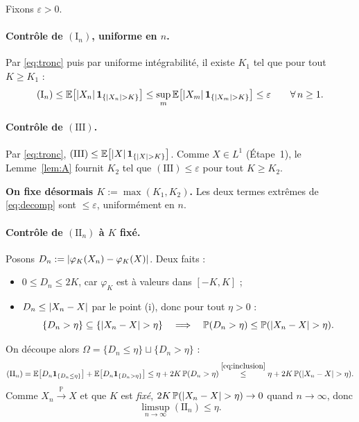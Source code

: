 \documentclass[11pt,a4paper]{article}
\theoremstyle{definition}
\theoremstyle{remark}
\newcommand{\E}{\mathbb{E}}
\newcommand{\PP}{\mathbb{P}}
\newcommand{\ind}[1]{\mathbf{1}_{#1}}
\newcommand{\convP}{\xrightarrow{\ \PP\ }}
\DeclarePairedDelimiter{\abs}{\lvert}{\rvert}
\begin{document}
Fixons $\varepsilon > 0$.

\paragraph{Contrôle de $(\mathrm{I}_n)$, uniforme en $n$.}
Par \eqref{eq:tronc} puis par uniforme intégrabilité, il existe $K_1$ tel que
pour tout $K \ge K_1$ :
\[
(\mathrm{I}_n)
\le \E\big[\abs{X_n}\,\ind{\{\abs{X_n} > K\}}\big]
\le \sup_{m} \E\big[\abs{X_m}\,\ind{\{\abs{X_m} > K\}}\big]
\le \varepsilon
\qquad \forall\, n \ge 1.
\]

\paragraph{Contrôle de $(\mathrm{III})$.}
Par \eqref{eq:tronc},
$(\mathrm{III}) \le \E\big[\abs{X}\,\ind{\{\abs{X} > K\}}\big]$. Comme
$X \in L^1$ (Étape~1), le Lemme~\ref{lem:A} fournit $K_2$ tel que
$(\mathrm{III}) \le \varepsilon$ pour tout $K \ge K_2$.

\medskip
\noindent
\textbf{On fixe désormais $K := \max(K_1, K_2)$.} Les deux termes extrêmes de
\eqref{eq:decomp} sont $\le \varepsilon$, uniformément en $n$.

\paragraph{Contrôle de $(\mathrm{II}_n)$ à $K$ fixé.}
Posons $D_n := \abs{\varphi_K(X_n) - \varphi_K(X)}$. Deux faits :
\begin{itemize}
\item $0 \le D_n \le 2K$, car $\varphi_K$ est à valeurs dans $[-K, K]$ ;
\item $D_n \le \abs{X_n - X}$ par le point (i), donc pour tout $\eta > 0$ :
\begin{equation}\label{eq:inclusion}
\{D_n > \eta\} \subseteq \{\abs{X_n - X} > \eta\}
\quad\Longrightarrow\quad
\PP(D_n > \eta) \le \PP(\abs{X_n - X} > \eta).
\end{equation}
\end{itemize}
On découpe alors $\Omega = \{D_n \le \eta\} \sqcup \{D_n > \eta\}$ :
\[
(\mathrm{II}_n)
= \E\big[D_n \ind{\{D_n \le \eta\}}\big] + \E\big[D_n \ind{\{D_n > \eta\}}\big]
\le \eta + 2K\,\PP(D_n > \eta)
\overset{\eqref{eq:inclusion}}{\le} \eta + 2K\,\PP(\abs{X_n - X} > \eta).
\]
Comme $X_n \convP X$ et que $K$ est \emph{fixé},
$2K\,\PP(\abs{X_n - X} > \eta) \to 0$ quand $n \to \infty$, donc
\[
\limsup_{n \to \infty} (\mathrm{II}_n) \le \eta.
\]
\end{document}
